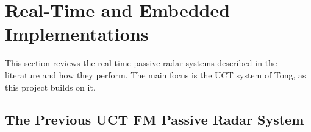 


\section{Real-Time and Embedded Implementations}
\label{sec:ch2.implementations}
\todo{}
This section reviews the real-time passive radar systems described in the literature and how they perform. The main focus is the UCT system of Tong, as this project builds on it.
\subsection{The Previous UCT FM Passive Radar System}
\label{subsec:ch2.implementations.uct}
\todo{}

